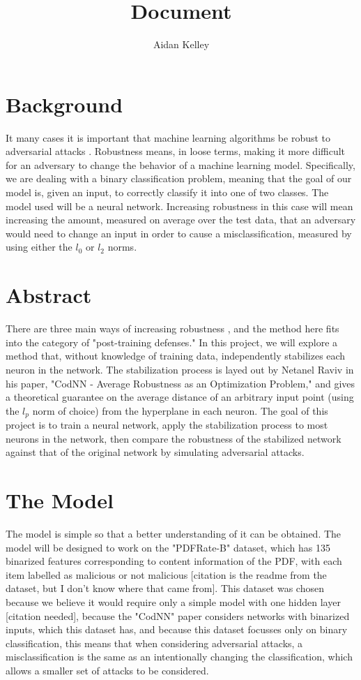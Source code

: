 \documentclass{article}
\title{Document}
\author{Aidan Kelley}
\DeclareMathOperator{\1}{\mathbb{1}}
\begin{document}
\maketitle

\section{Background}

It many cases it is important that machine learning algorithms be robust to adversarial attacks \cite[abstract]{vorobook}. Robustness means, in loose terms, making it more difficult for an adversary to change the behavior of a machine learning model. Specifically, we are dealing with a binary classification problem, meaning that the goal of our model is, given an input, to correctly classify it into one of two classes. The model used will be a neural network. Increasing robustness in this case will mean increasing the amount, measured on average over the test data, that an adversary would need to change an input in order to cause a misclassification, measured by using either the $l_0$ or $l_2$ norms. 

\section{Abstract}

There are three main ways of increasing robustness \cite{ecocpaper}, and the method here fits into the category of "post-training defenses." In this project, we will explore a method that, without knowledge of training data, independently stabilizes each neuron in the network. The stabilization process is layed out by Netanel Raviv in his paper, "CodNN - Average Robustness as an Optimization Problem," \nocite{cod2} and gives a theoretical guarantee on the average distance of an arbitrary input point (using the $l_p$ norm of choice) from the hyperplane in each neuron. The goal of this project is to train a neural network, apply the stabilization process to most neurons in the network, then compare the robustness of the stabilized network against that of the original network by simulating adversarial attacks.

\section{The Model}

The model is simple so that a better understanding of it can be obtained. The model will be designed to work on the "PDFRate-B" dataset, which has 135 binarized features corresponding to content information of the PDF, with each item labelled as malicious or not malicious [citation is the readme from the dataset, but I don't know where that came from]. This dataset was chosen because we believe it would require only a simple model with one hidden layer [citation needed], because the "CodNN" paper considers networks with binarized inputs, which this dataset has, and because this dataset focusses only on binary classification, this means that when considering adversarial attacks, a misclassification is the same as an intentionally changing the classification, which allows a smaller set of attacks to be considered.
\end{document}
